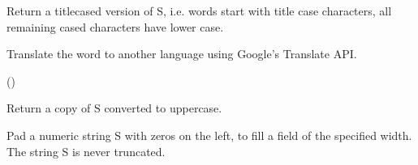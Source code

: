 \documentclass[letterpaper,10pt,english]{sphinxmanual}
\begin{document}
\begin{fulllineitems}
\begin{fulllineitems}
\end{fulllineitems}


\begin{fulllineitems}
\label{api_reference:textblob_de.blob.Word.title}
Return a titlecased version of S, i.e. words start with title case
characters, all remaining cased characters have lower case.

\end{fulllineitems}


\begin{fulllineitems}
\label{api_reference:textblob_de.blob.Word.translate}
Translate the word to another language using Google's Translate API.

()

\end{fulllineitems}


\begin{fulllineitems}
\label{api_reference:textblob_de.blob.Word.upper}
Return a copy of S converted to uppercase.

\end{fulllineitems}


\begin{fulllineitems}
\label{api_reference:textblob_de.blob.Word.zfill}
Pad a numeric string S with zeros on the left, to fill a field
of the specified width. The string S is never truncated.

\end{fulllineitems}


\end{fulllineitems}

\end{document}
